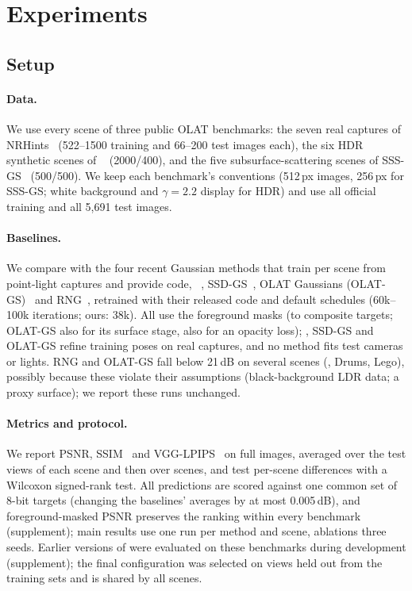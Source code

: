 \section{Experiments}
\label{sec:experiments}



\subsection{Setup}
\label{sec:setup}
\paragraph{Data.}
We use every scene of three public OLAT benchmarks: the seven real captures of NRHints~\cite{zeng2023nrhints} (522--1500 training and 66--200 test images each), the six HDR synthetic scenes of \gsthree~\cite{bi2024gs3} (2000/400), and the five subsurface-scattering scenes of SSS-GS~\cite{dihlmann2024sss} (500/500).
We keep each benchmark's conventions (512\,px images, 256\,px for SSS-GS; white background and $\gamma=2.2$ display for HDR) and use all official training and all 5,691 test images.

\paragraph{Baselines.}
We compare with the four recent Gaussian methods that train per scene from point-light captures and provide code, \gsthree~\cite{bi2024gs3}, SSD-GS~\cite{zheng2026ssdgs}, OLAT Gaussians (OLAT-GS)~\cite{kuang2024olat} and RNG~\cite{fan2025rng}, retrained with their released code and default schedules (60k--100k iterations; ours: 38k).
All use the foreground masks (to composite targets; OLAT-GS also for its surface stage, \ours also for an opacity loss); \gsthree, SSD-GS and OLAT-GS refine training poses on real captures, and no method fits test cameras or lights.
RNG and OLAT-GS fall below 21\,dB on several scenes (\eg, Drums, Lego), possibly because these violate their assumptions (black-background LDR data; a proxy surface); we report these runs unchanged.

\paragraph{Metrics and protocol.}
We report PSNR, SSIM~\cite{wang2004image} and VGG-LPIPS~\cite{zhang2018unreasonable} on full images, averaged over the test views of each scene and then over scenes, and test per-scene differences with a Wilcoxon signed-rank test.
All predictions are scored against one common set of 8-bit targets (changing the baselines' averages by at most 0.005\,dB), and foreground-masked PSNR preserves the ranking within every benchmark (supplement); main results use one run per method and scene, ablations three seeds.
Earlier versions of \ours were evaluated on these benchmarks during development (supplement); the final configuration was selected on views held out from the training sets and is shared by all scenes.


